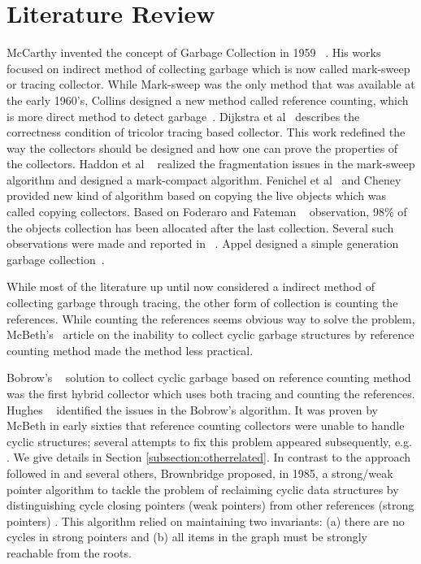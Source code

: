 \section{Literature Review}
McCarthy invented the concept of Garbage Collection in 1959 ~\cite{mccarthy}. His works focused on indirect method of collecting 
garbage which is now called mark-sweep or tracing collector. While Mark-sweep  was the only method that was available at the early 1960's, 
 Collins designed a new method called reference counting, which is more direct method to detect garbage~\cite{Collins1960}. 
 Dijkstra et al~\cite{dijkstra} describes the correctness condition of tricolor tracing based collector. This work redefined the 
 way the collectors should be designed and how one can prove the properties of the collectors. Haddon et al ~\cite{haddon} realized 
 the fragmentation issues in the mark-sweep algorithm and designed a mark-compact algorithm. Fenichel et al~\cite{feni} and Cheney~\cite{cheney}
 provided new kind of algorithm based on copying the live objects which was called copying collectors. Based on Foderaro and Fateman ~\cite{fode81} observation, 
 98\% of the objects collection has been allocated after the last collection. Several such observations were made and reported in ~\cite{zorn89,sans93}.
 Appel  designed a simple generation garbage collection~\cite{Appel89}.
 
 While most of the literature up until now considered a indirect method of collecting garbage through tracing, the other form of collection is counting the references.
 While counting the references seems obvious way to solve the problem, McBeth's~\cite{McBeth1963} article on the inability to collect cyclic garbage structures by 
 reference counting method made the method less practical.

Bobrow's ~\cite{Bobrow1980} solution to collect cyclic garbage based on reference counting method was the first hybrid collector which uses both tracing and
counting the references. Hughes ~\cite{hugh83,hugh87} identified the issues in the Bobrow's algorithm.
It was proven by McBeth \cite{McBeth1963} in early sixties that reference counting collectors were unable to handle cyclic structures; several attempts to fix this problem appeared subsequently, e.g. \cite{Friedman1979,Bobrow1980,Lins2008}. We give details in Section \ref{subsection:otherrelated}.
In contrast to the approach followed in \cite{Friedman1979,Bobrow1980,Lins2008} and several others,
Brownbridge \cite{Brownbridge1985} proposed, in 1985, a strong/weak pointer algorithm to tackle the problem of reclaiming cyclic data structures by distinguishing cycle closing pointers (weak pointers) from other references (strong pointers) \cite{Jones1996}. %
This algorithm relied on maintaining two invariants: (a) there are no cycles in strong pointers and (b) all items in the graph must be strongly reachable from the roots.

